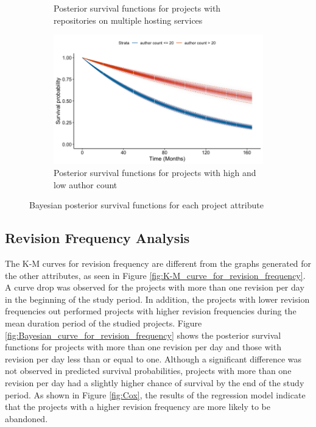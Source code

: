 \documentclass[sigconf,review]{acmart}
\begin{document}
\begin{figure}
\begin{subfigure}[b]{\columnwidth}
        \caption{\small Posterior survival functions for projects with repositories on multiple hosting services}
        \label{fig:bayes_multi_repo}
    \end{subfigure}
    \hfill
    \begin{subfigure}[b]{\columnwidth}
        \centering 
        \includegraphics[width=\textwidth]{author_count_bayes.png} 
        \caption{\small Posterior survival functions for projects with high and low author count}
        \label{fig:bayes_author_count}
    \end{subfigure}
    \caption{\small Bayesian posterior survival functions for each project attribute} 
    \label{fig:Bayesian posterior survival functions}
\end{figure}

\subsection{Revision Frequency Analysis} \label{rev-freq-results}

The K-M curves for revision frequency are different from the graphs generated for the other attributes, as seen in Figure \ref{fig:K-M_curve_for_revision_frequency}. 
A curve drop was observed for the projects with more than one revision per day in the beginning of the study period.
In addition, the projects with lower revision frequencies out performed projects with higher revision frequencies during the mean duration period of the studied projects.
Figure \ref{fig:Bayesian_curve_for_revision_frequency} shows the posterior survival functions for projects with more than one revision per day and those with revision per day less than or equal to one. Although a significant difference was not observed in predicted survival probabilities, projects with more than one revision per day had a slightly higher chance of survival by the end of the study period.
As shown in Figure \ref{fig:Cox}, the results of the regression model indicate that the projects with a higher revision frequency are more likely to be abandoned.
\end{document}
